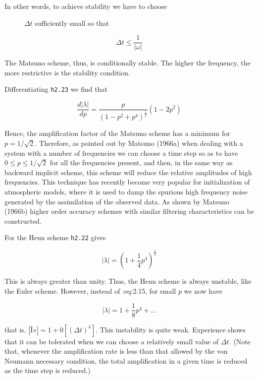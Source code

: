 \begin{description}
    \item[In other words, to achieve stability we have to choose]
    \(\Delta t\) sufficiently small so that
\end{description}

\[\Delta t \leq \frac{1}{| \omega |}\]

The Matsuno scheme, thus, is conditionally stable. The higher the
frequency, the more restrictive is the stability condition.

Differentiating \texttt{h2.23} we find that

\[\frac{d |\lambda|}{d p} = \frac{p}{( 1 - p^2 + p^4 )^{\frac{1}{2}} } ( 1 - 2 p^2 )\]

Hence, the amplification factor of the Matsuno scheme has a minimum for
\(p = 1/\sqrt{2}\). Therefore, as pointed out by Matsuno (1966a) when
dealing with a system with a number of frequencies we can choose a time
step so as to have \(0 \leq p \leq 1/\sqrt{2}\) for all the frequencies
present, and then, in the same way as backward implicit scheme, this
scheme will reduce the relative amplitudes of high frequencies. This
technique has recently become very popular for initialization of
atmospheric models, where it is used to damp the spurious high frequency
noise generated by the assimilation of the observed data. As shown by
Matsuno (1966b) higher order accuracy schemes with similar filtering
characteristics can be constructed.

For the Heun scheme \texttt{h2.22} gives

\[| \lambda | = \left( 1 + \frac{1}{4}p^{4} \right)^{\frac{1}{2}}\]

This is always greater than unity. Thus, the Heun scheme is always
unstable, like the Euler scheme. However, instead of :eq:2.15, for small
\(p\) we now have

\[| \lambda | = 1 + \frac{1}{8}p^{4} + \ldots\]

that is,
\(\left| \text{Î»} \right| = 1 + 0\left\lbrack \left( \Delta t \right)^{4} \right\rbrack\).
This instability is quite weak. Experience shows that it can be
tolerated when we can choose a relatively small value of \(\Delta t\).
(Note that, whenever the amplification rate is less than that allowed by
the von Neumann necessary condition, the total amplification in a given
time is reduced as the time step is reduced.)

